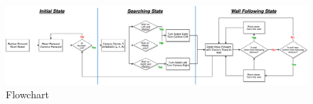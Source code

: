\documentclass[a4paper,12pt,twocolumn]{article}
\begin{document}

\begin{figure}[ht]
\centering
\includegraphics[width=\linewidth]{figures/flowchart/System-Flowchart.png}
\caption{Flowchart}
  \label{fig:flowchart}
\end{figure}
\end{document}
